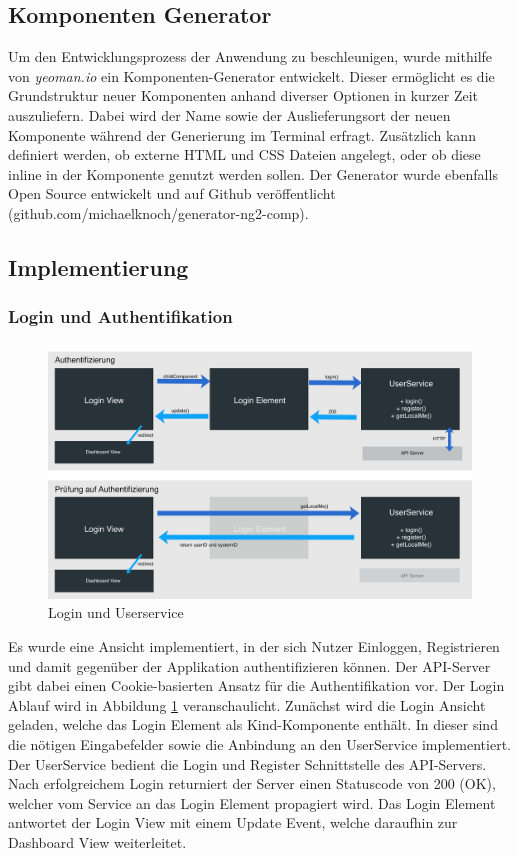 \subsection{Komponenten Generator}

Um den Entwicklungsprozess der Anwendung zu beschleunigen, wurde mithilfe von \emph{yeoman.io} ein Komponenten-Generator entwickelt.
Dieser ermöglicht es die Grundstruktur neuer Komponenten anhand diverser Optionen in kurzer Zeit auszuliefern.
Dabei wird der Name sowie der Auslieferungsort der neuen Komponente während der Generierung im Terminal erfragt.
Zusätzlich kann definiert werden, ob externe \ac{HTML} und \ac{CSS} Dateien angelegt, oder ob diese inline in der Komponente genutzt werden sollen.
Der Generator wurde ebenfalls Open Source entwickelt und auf Github veröffentlicht
(github.com/michaelknoch/generator-ng2-comp).

\subsection{Implementierung}


\subsubsection{Login und Authentifikation}
\label{Login-und-Authentifikation}

\begin{figure}[hptb]
 \centering
 \includegraphics[width=\linewidth]{kapitel4/login.jpg}
 \caption{Login und Userservice}
 \label{kapitel4/login}
\end{figure}
\vspace{0.3cm}

Es wurde eine Ansicht implementiert, in der sich Nutzer Einloggen, Registrieren und damit gegenüber der Applikation authentifizieren können.
Der \ac{API}-Server gibt dabei einen Cookie-basierten Ansatz für die Authentifikation vor. Der Login Ablauf wird in Abbildung \ref{kapitel4/login} veranschaulicht.
Zunächst wird die Login Ansicht geladen, welche das Login Element als Kind-Komponente enthält.
In dieser sind die nötigen Eingabefelder sowie die Anbindung an den UserService implementiert.
Der UserService bedient die Login und Register Schnittstelle des \ac{API}-Servers.
Nach erfolgreichem Login returniert der Server einen Statuscode von 200 (OK), welcher vom Service an das Login Element propagiert wird.
Das Login Element antwortet der Login View mit einem Update Event, welche daraufhin zur Dashboard View weiterleitet.

